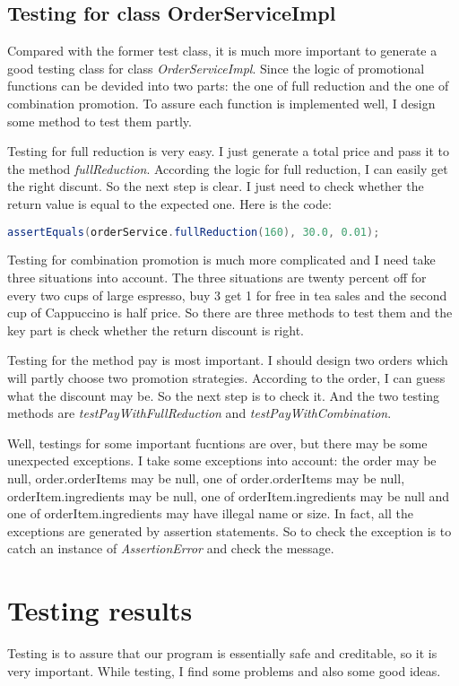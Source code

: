 \documentclass[a4paper]{report}
\begin{document}
\subsection {Testing for class OrderServiceImpl}
\par Compared with the former test class, it is much more important to generate a good testing class for class \emph{OrderServiceImpl}. Since the logic of promotional functions can be devided into two parts: the one of full reduction and the one of combination promotion. To assure each function is implemented well, I design some method to test them partly.
\par Testing for full reduction is very easy. I just generate a total price and pass it to the method \emph{fullReduction}. According the logic for full reduction, I can easily get the right discunt. So the next step is clear. I just need to check whether the return value is equal to the expected one. Here is the code:
  \begin{lstlisting}[language=java]
        assertEquals(orderService.fullReduction(160), 30.0, 0.01);
	\end{lstlisting}
\par Testing for combination promotion is much more complicated and I need take three situations into account. The three situations are twenty percent off for every two cups of large espresso, buy 3 get 1 for free in tea sales and the second cup of Cappuccino is half price. So there are three methods to test them and the key part is check whether the return discount is right.
\par Testing for the method pay is most important. I should design two orders which will partly choose two promotion strategies. According to the order, I can guess what the discount may be. So the next step is to check it. And the two testing methods are \emph{testPayWithFullReduction} and \emph{testPayWithCombination}.
\par Well, testings for some important fucntions are over, but there may be some unexpected exceptions. I take some exceptions into account: the order may be null, order.orderItems may be null, one of order.orderItems may be null, orderItem.ingredients may be null, one of orderItem.ingredients may be null and one of orderItem.ingredients may have illegal name or size. In fact, all the exceptions are generated by assertion statements. So to check the exception is to catch an instance of \emph{AssertionError} and check the message.

\section{Testing results}
Testing is to assure that our program is essentially safe and creditable, so it is very important. While testing, I find some problems and also some good ideas.
\end{document}
